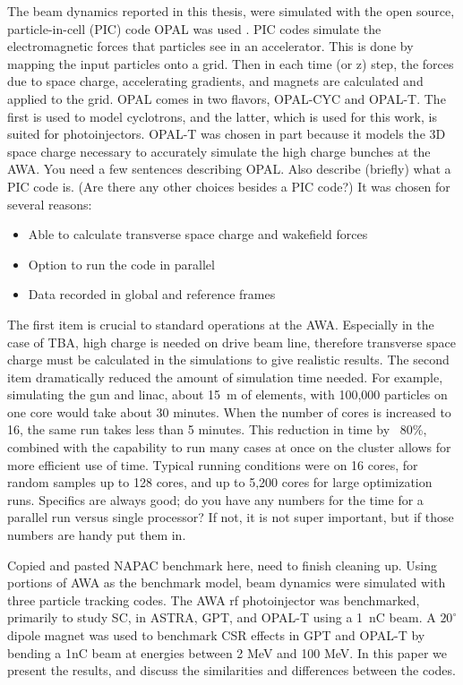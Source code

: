 \documentclass{iitthesis}
\newcommand{\lsnote}[1]{\textsf{{\color{violet}{ LS note:}   #1 }}}
\newcommand{\nrnote}[1]{\textsf{{\color{blue}{ NN note:}   #1 }}}
\begin{document}
The beam dynamics reported in this thesis, were simulated with 
the open source, particle-in-cell (PIC) code OPAL was used \cite{opal}. 
PIC codes simulate the electromagnetic forces that particles see in an accelerator. 
This is done by mapping the input particles onto a grid. 
Then in each time (or z) step, the forces due to space charge, accelerating gradients, 
and magnets are calculated and applied to the grid.
OPAL comes in two flavors, OPAL-CYC and OPAL-T. The first is used to model 
cyclotrons, and the latter, which is used for this work, is suited for photoinjectors. 
OPAL-T was chosen in part because it models the 3D space charge necessary to accurately simulate the high charge bunches at the AWA. 
\lsnote{You need a few sentences describing OPAL.  Also describe (briefly) what a PIC code is.  (Are there any other choices besides a PIC code?)}
It was chosen for several reasons:
\begin{itemize}
	\item Able to calculate transverse space charge and wakefield forces 
	\item Option to run the code in parallel
	\item Data recorded in global and reference frames
\end{itemize} 

The first item is crucial to standard operations at the AWA. Especially in the 
case of TBA, high charge is needed on drive beam line, therefore transverse 
space charge must be calculated in the simulations to give realistic results.
The second item dramatically reduced the amount of simulation time needed. 
For example, simulating the gun and linac, about \SI{15}{m} of elements,
with 100,000 particles on one core would take about 30 minutes. 
When the number of cores is increased to 16, the same run takes less than 
5 minutes. This reduction in time by ~80\%, combined with the capability to run 
many cases at once on the cluster allows for more efficient use of time.
Typical running conditions were on 16 cores, for random samples up to 128 cores, 
and up to 5,200 cores for large optimization runs.  
\lsnote{Specifics are always good; do you have any numbers for the time for a parallel run versus single processor?  If not, it is not super important, but if those numbers are handy put them in.}

\nrnote{Copied and pasted NAPAC benchmark here, need to finish cleaning up.}
Using portions of AWA as the benchmark model,  
beam dynamics were simulated with three particle tracking codes.
The AWA rf photoinjector was benchmarked, primarily to study SC, 
in ASTRA, GPT, and OPAL-T using a \SI{1}{nC} beam. 
A $20^{\circ}$ dipole magnet was used to benchmark 
CSR effects in GPT and OPAL-T by bending a 1nC beam 
at  energies  between  2  MeV  and  100  MeV.  In  this  paper  
we  present  the  results,  and  discuss  the  similarities  and  
differences between the codes.
 
\end{document}
